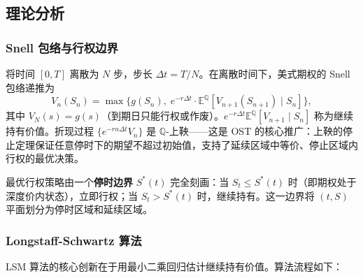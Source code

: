 \subsection{理论分析}

\subsubsection{Snell 包络与行权边界}

将时间 $[0, T]$ 离散为 $N$ 步，步长 $\Delta t = T/N$。在离散时间下，美式期权的 Snell 包络递推为
\begin{equation}\label{eq:snell_option}
  V_n(S_n) = \max\Big\{g(S_n),\; e^{-r\Delta t} \cdot \mathbb{E}^{\mathbb{Q}}[V_{n+1}(S_{n+1}) \mid S_n]\Big\},
\end{equation}
其中 $V_N(s) = g(s)$（到期日只能行权或作废）。$e^{-r\Delta t} \mathbb{E}^{\mathbb{Q}}[V_{n+1} \mid S_n]$ 称为继续持有价值。折现过程 $\{e^{-r n\Delta t} V_n\}$ 是 $\mathbb{Q}$-上鞅——这是 OST 的核心推广：上鞅的停止定理保证任意停时下的期望不超过初始值，支持了延续区域中等价、停止区域内行权的最优决策。

最优行权策略由一个\textbf{停时边界} $S^*(t)$ 完全刻画：当 $S_t \leqslant S^*(t)$ 时（即期权处于深度价内状态），立即行权；当 $S_t > S^*(t)$ 时，继续持有。这一边界将 $(t, S)$ 平面划分为停时区域和延续区域。

\subsubsection{Longstaff-Schwartz 算法}

LSM 算法的核心创新在于用最小二乘回归估计继续持有价值。算法流程如下：

